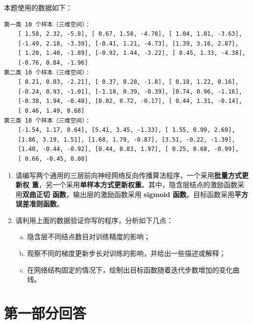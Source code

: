 \documentclass[a4paper,11pt,onecolumn,oneside,UTF8]{article}
\begin{document}
本题使用的数据如下：\\
\begin{lstlisting}
第一类 10 个样本（三维空间）：
    [ 1.58, 2.32, -5.8], [ 0.67, 1.58, -4.78], [ 1.04, 1.01, -3.63],
    [-1.49, 2.18, -3.39], [-0.41, 1.21, -4.73], [1.39, 3.16, 2.87],
    [ 1.20, 1.40, -1.89], [-0.92, 1.44, -3.22], [ 0.45, 1.33, -4.38],
    [-0.76, 0.84, -1.96]
第二类 10 个样本（三维空间）：
    [ 0.21, 0.03, -2.21], [ 0.37, 0.28, -1.8], [ 0.18, 1.22, 0.16],
    [-0.24, 0.93, -1.01], [-1.18, 0.39, -0.39], [0.74, 0.96, -1.16],
    [-0.38, 1.94, -0.48], [0.02, 0.72, -0.17], [ 0.44, 1.31, -0.14],
    [ 0.46, 1.49, 0.68]
第三类 10 个样本（三维空间）：
    [-1.54, 1.17, 0.64], [5.41, 3.45, -1.33], [ 1.55, 0.99, 2.69],
    [1.86, 3.19, 1.51], [1.68, 1.79, -0.87], [3.51, -0.22, -1.39],
    [1.40, -0.44, -0.92], [0.44, 0.83, 1.97], [ 0.25, 0.68, -0.99],
    [ 0.66, -0.45, 0.08]
\end{lstlisting}

\begin{enumerate}
    \item
          请编写两个通用的三层前向神经网络反向传播算法程序，一个采用{\color{blue}\textbf{批量方式更新权
              重}}，另一个采用{\color{blue}\textbf{单样本方式更新权重}}。其中，隐含层结点的激励函数采用{\color{blue}\textbf{双曲正切
              函数}}，输出层的激励函数采用 {\color{blue}\textbf{sigmoid 函数}}。目标函数采用{\color{blue}\textbf{平方误差准则函数}}。
    \item
          请利用上面的数据验证你写的程序，分析如下几点：
          \begin{enumerate}[(a)]
              \item 隐含层不同结点数目对训练精度的影响；
              \item 观察不同的梯度更新步长对训练的影响，并给出一些描述或解释；
              \item 在网络结构固定的情况下，绘制出目标函数随着迭代步数增加的变化曲线。

          \end{enumerate}

\end{enumerate}

\section*{第一部分回答}
\end{document}
